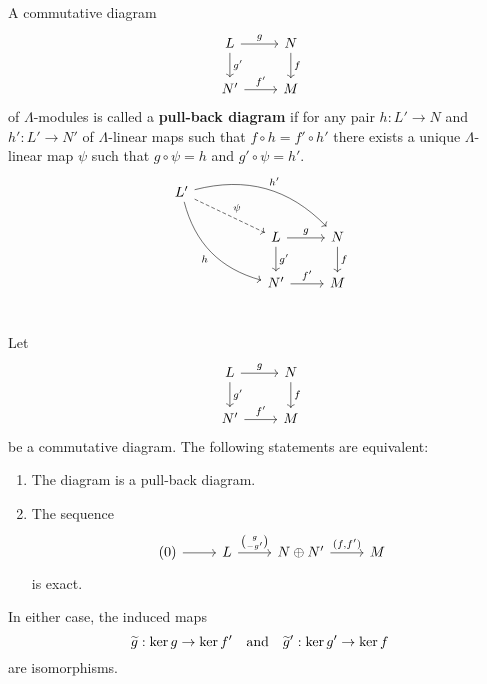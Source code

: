 %




\begin{definition}
A commutative diagram
\[
\begin{tikzcd}
	L\ar[r,"g"]\ar[d,"g'"] & N\ar[d,"f"] \\
	N'\ar[r,"f'"] & M
\end{tikzcd}
\]
of $\Lambda$-modules is called a \textbf{pull-back diagram} if for any pair $h:L'\to N$ and $h':L'\to N'$ of $\Lambda$-linear maps such that $f\circ h = f'\circ h'$ there exists a unique $\Lambda$-linear map $\psi$ such that $g\circ \psi = h$ and $g'\circ \psi = h'$. 
%
\[
\begin{tikzcd}
L'\ar[drrr,bend left,"h'"]\ar[ddrr,bend right,"h"']\ar[drr,dashed,"\psi"] &   &   &\\
& & L\ar[r,"g"]\ar[d,"g'"] & N\ar[d,"f"] \\
& & N'\ar[r,"f'"] & M \\
\end{tikzcd}
\]
% 
\end{definition}


\begin{proposition}\label{2.1.3}
Let
\[
\begin{tikzcd}
	L\ar[r,"g"]\ar[d,"g'"] & N\ar[d,"f"] \\
	N'\ar[r,"f'"] & M
\end{tikzcd}
\]
be a commutative diagram. The following statements are equivalent:
\begin{enumerate}
\item The diagram is a pull-back diagram.
\item The sequence
\[
\begin{tikzcd}
	(0) \rar  & L \ar[r,"\binom{g}{-g'}"] & N \oplus N' \ar[r,"{(f,f')}"] & M
\end{tikzcd}
\]
is exact.
\end{enumerate}
In either case, the induced maps
\[
\widetilde g : \ker g \to \ker f'
\quad\text{and}\quad
\widetilde g' : \ker g' \to \ker f
\]
are isomorphisms.
\end{proposition}


